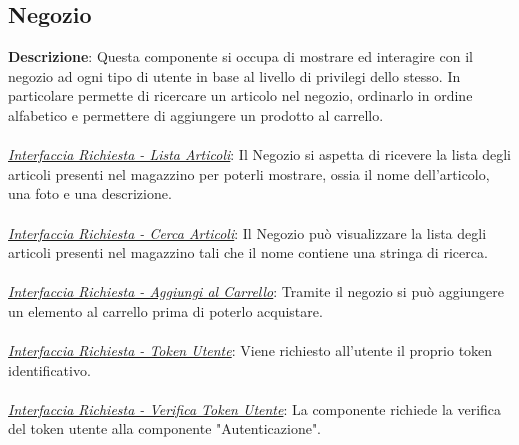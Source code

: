 \documentclass{report}
\begin{document}
\subsection*{Negozio}
\textbf{Descrizione}: Questa componente si occupa di mostrare  ed interagire con il negozio ad ogni tipo di utente in base al livello di privilegi dello stesso. In particolare permette di ricercare un articolo nel negozio, ordinarlo in ordine alfabetico e permettere di aggiungere un prodotto al carrello.\\\\
\uline{\textit{Interfaccia Richiesta - Lista Articoli}}: 
Il Negozio si aspetta di ricevere la lista degli articoli presenti nel magazzino per poterli mostrare, ossia il nome dell'articolo, una foto e una descrizione. \\ \\
\uline{\textit{Interfaccia Richiesta - Cerca Articoli}}: 
Il Negozio può visualizzare la lista degli articoli presenti nel magazzino tali che il nome contiene una stringa di ricerca.\\\\
\uline{\textit{Interfaccia Richiesta - Aggiungi al Carrello}}: 
Tramite il negozio si può aggiungere un elemento al carrello prima di poterlo acquistare. \\ \\
\uline{\textit{Interfaccia Richiesta - Token Utente}}: 
Viene richiesto all'utente il proprio token identificativo.\\ \\
\uline{\textit{Interfaccia Richiesta - Verifica Token Utente}}: 
La componente richiede la verifica del token utente alla componente "Autenticazione".\\\\
\end{document}
